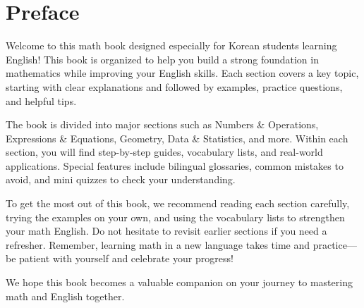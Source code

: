 \newpage
\section*{Preface}
Welcome to this math book designed especially for Korean students learning English! 
This book is organized to help you build a strong foundation in mathematics while 
improving your English skills. Each section covers a key topic, starting with clear 
explanations and followed by examples, practice questions, and helpful tips.


The book is divided into major sections such as Numbers \& Operations, Expressions 
\& Equations, Geometry, 
Data \& Statistics, and more. Within each section, you will find step-by-step guides, 
vocabulary lists, and real-world applications. Special features include bilingual 
glossaries, common mistakes to avoid, and mini quizzes to check your understanding.


To get the most out of this book, we recommend reading each section carefully, 
trying the examples on your own, and using the vocabulary lists to strengthen 
your math English. Do not hesitate to revisit earlier sections if you need a 
refresher. Remember, learning math in a new language takes time and practice—be 
patient with yourself and celebrate your progress!


We hope this book becomes a valuable companion on your journey to mastering math 
and English together.


